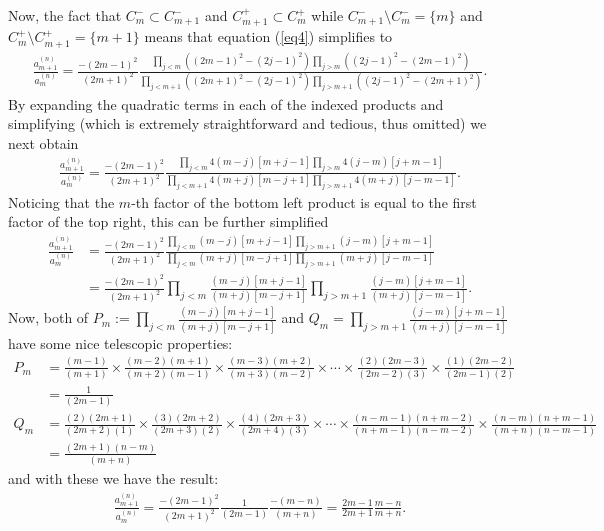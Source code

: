 \documentclass[10pt]{article}
\newcommand{\1}[1]{\mathbbm{1}_{#1}}
\begin{document}
    Now, the fact that $C_m^-\subset C_{m+1}^-$ and $C_{m+1}^+\subset C_m^+$ while $C_{m+1}^-\setminus C_{m}^-=\{m\}$ and $C_m^+\setminus C_{m+1}^+=\{m+1\}$ means that equation (\ref{eq4}) simplifies to
    \begin{align*}
        \frac{a^{(n)}_{m+1}}{a^{(n)}_m}=\frac{-(2m-1)^2}{(2m+1)^2}\frac{\prod_{j<m}((2m-1)^2-(2j-1)^2)\prod_{j>m}((2j-1)^2-(2m-1)^2)}{\prod_{j<m+1}((2m+1)^2-(2j-1)^2)\prod_{j>m+1}((2j-1)^2-(2m+1)^2)}.
    \end{align*}
    By expanding the quadratic terms in each of the indexed products and simplifying (which is extremely straightforward and tedious, thus omitted) we next obtain
    \begin{align*}
        \frac{a^{(n)}_{m+1}}{a^{(n)}_m}=\frac{-(2m-1)^2}{(2m+1)^2}\frac{\prod_{j<m}4(m-j)[m+j-1]\prod_{j>m}4(j-m)[j+m-1]}{\prod_{j<m+1}4(m+j)[m-j+1]\prod_{j>m+1}4(m+j)[j-m-1]}.
    \end{align*}
    Noticing that the $m$-th factor of the bottom left product is equal to the first factor of the top right, this can be further simplified
    \begin{align*}
        \frac{a^{(n)}_{m+1}}{a^{(n)}_m}&=\frac{-(2m-1)^2}{(2m+1)^2}\frac{\prod_{j<m}(m-j)[m+j-1]\prod_{j>m+1}(j-m)[j+m-1]}{\prod_{j<m}(m+j)[m-j+1]\prod_{j>m+1}(m+j)[j-m-1]}\\
        &=\frac{-(2m-1)^2}{(2m+1)^2}\prod_{j<m}\frac{(m-j)[m+j-1]}{(m+j)[m-j+1]}\prod_{j>m+1}\frac{(j-m)[j+m-1]}{(m+j)[j-m-1]}.
    \end{align*}
    Now, both of $P_m:=\prod_{j<m}\tfrac{(m-j)[m+j-1]}{(m+j)[m-j+1]}$ and $Q_m=\prod_{j>m+1}\tfrac{(j-m)[j+m-1]}{(m+j)[j-m-1]}$ have some nice telescopic properties:
    \begin{align*}
        P_m&=\frac{(m-1)}{(m+1)}\times\frac{(m-2)(m+1)}{(m+2)(m-1)}\times\frac{(m-3)(m+2)}{(m+3)(m-2)}\times\cdots\times\frac{(2)(2m-3)}{(2m-2)(3)}\times\frac{(1)(2m-2)}{(2m-1)(2)}\\
        &=\frac{1}{(2m-1)}\\
        Q_m&=\frac{(2)(2m+1)}{(2m+2)(1)}\times\frac{(3)(2m+2)}{(2m+3)(2)}\times\frac{(4)(2m+3)}{(2m+4)(3)}\times\cdots\times\frac{(n-m-1)(n+m-2)}{(n+m-1)(n-m-2)}\times\frac{(n-m)(n+m-1)}{(m+n)(n-m-1)}\\
        &=\frac{(2m+1)(n-m)}{(m+n)}
    \end{align*}
    and with these we have the result:
    \begin{align*}
        \frac{a^{(n)}_{m+1}}{a^{(n)}_m}=\frac{-(2m-1)^2}{(2m+1)^2}\frac{1}{(2m-1)}\frac{-(m-n)}{(m+n)}=\frac{2m-1}{2m+1}\frac{m-n}{m+n}.\tag*{$\qed$}
    \end{align*}
\end{document}
